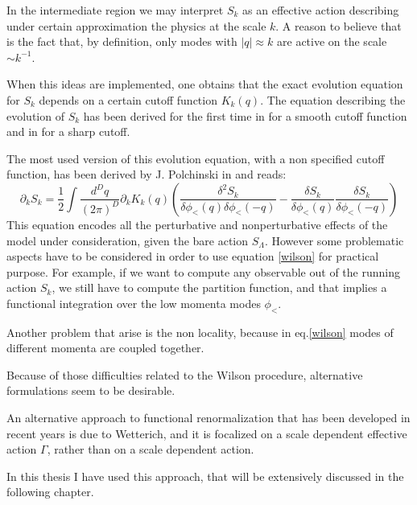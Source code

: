 In the intermediate region we may interpret $S_k$ as an effective action describing under certain approximation the physics at the scale 
$k$. A reason to believe that is the fact that, by definition, only modes with $|q| \approx k$ are active on the scale $\sim k^{-1}$.

When this ideas are implemented, one obtains that the exact evolution equation for $S_k$ depends on a certain cutoff function $K_k(q)$.
The equation describing the evolution of $S_k$ has been derived for the first time in \cite{wilson2} for a smooth cutoff function and
in \cite{cinquantotto} for a sharp cutoff.

The most used version of this evolution equation, with a non specified cutoff function, has been derived by J. Polchinski in  \cite{Polchinski} and reads:
\begin{equation}\label{wilson}
 \partial_kS_k = \frac{1}{2} \int \frac{d^Dq}{(2\pi)^D}\partial_kK_k(q)\left(\frac{\delta^2S_k}{\delta \phi_<(q)\delta \phi_<(-q)}- \frac{\delta S_k}{\delta \phi_<(q)}\frac{\delta S_k}{\delta \phi_<(-q)}\right)
\end{equation}
This equation encodes all the perturbative and nonperturbative effects of the model under consideration, given the bare action $S_\Lambda$.
However some problematic aspects have to be considered in order to use equation \eqref{wilson} for practical purpose. For example, if we want to compute any observable out of the running action $S_k$, we still have to compute the partition function, and that implies a functional integration over the low momenta modes $\phi_<$.

Another problem that arise is the non locality, because in eq.\eqref{wilson} modes of different momenta are coupled together. 


Because of those difficulties related to the Wilson procedure, alternative formulations seem to be desirable.

An alternative approach to functional renormalization that has been developed in recent years 
is due to Wetterich, and  it is focalized on a scale
dependent effective action $\Gamma$, rather than on a scale dependent action.

In this thesis I have used this approach, that will be extensively discussed in the following chapter.



